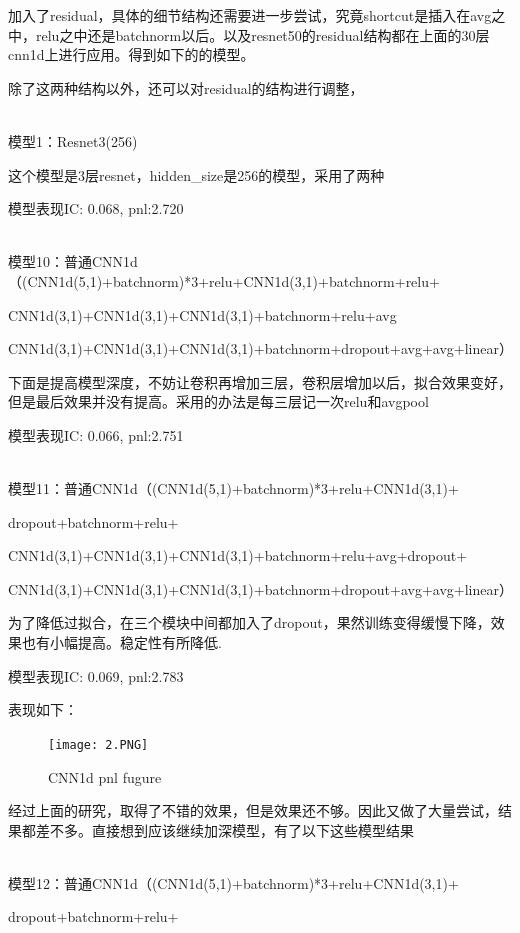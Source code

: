 \documentclass[11pt]{ctexart}
\begin{document}
加入了residual，具体的细节结构还需要进一步尝试，究竟shortcut是插入在avg之中，relu之中还是batchnorm以后。以及resnet50的residual结构都在上面的30层cnn1d上进行应用。得到如下的的模型。

除了这两种结构以外，还可以对residual的结构进行调整，

~\\
模型1：Resnet3(256)

这个模型是3层resnet，hidden\_size是256的模型，采用了两种

模型表现{\kaishu \small IC: 0.068, pnl:2.720}

~\\
模型10：普通CNN1d（(CNN1d(5,1)+batchnorm)*3+relu+CNN1d(3,1)+batchnorm+relu+

CNN1d(3,1)+CNN1d(3,1)+CNN1d(3,1)+batchnorm+relu+avg

CNN1d(3,1)+CNN1d(3,1)+CNN1d(3,1)+batchnorm+dropout+avg+avg+linear）

下面是提高模型深度，不妨让卷积再增加三层，卷积层增加以后，拟合效果变好，但是最后效果并没有提高。采用的办法是每三层记一次relu和avgpool

模型表现{\kaishu \small IC: 0.066, pnl:2.751}

~\\
模型11：普通CNN1d（(CNN1d(5,1)+batchnorm)*3+relu+CNN1d(3,1)+

dropout+batchnorm+relu+

CNN1d(3,1)+CNN1d(3,1)+CNN1d(3,1)+batchnorm+relu+avg+dropout+

CNN1d(3,1)+CNN1d(3,1)+CNN1d(3,1)+batchnorm+dropout+avg+avg+linear）

为了降低过拟合，在三个模块中间都加入了dropout，果然训练变得缓慢下降，效果也有小幅提高。稳定性有所降低.

模型表现{\kaishu \small IC: 0.069, pnl:2.783}

表现如下：
\begin{figure}[H]

\begin{center}
\texttt{[image: 2.PNG]}
\end{center}
\caption{CNN1d pnl fugure}
\label{FIG.1}
\end{figure}

经过上面的研究，取得了不错的效果，但是效果还不够。因此又做了大量尝试，结果都差不多。直接想到应该继续加深模型，有了以下这些模型结果

~\\
模型12：普通CNN1d（(CNN1d(5,1)+batchnorm)*3+relu+CNN1d(3,1)+

dropout+batchnorm+relu+
\end{document}
